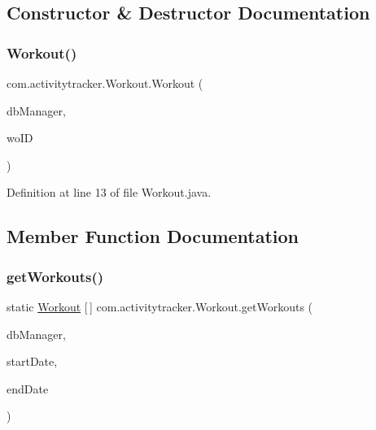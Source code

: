 \subsection{Constructor \& Destructor Documentation}
\mbox{\label{classcom_1_1activitytracker_1_1_workout_a2a991c1f2bcd46bc71e81b2c9bc3982a}} 
\subsubsection{\texorpdfstring{Workout()}{Workout()}}
{\footnotesize\ttfamily com.\+activitytracker.\+Workout.\+Workout (\begin{DoxyParamCaption}\item[{final \mbox{\hyperlink{classcom_1_1activitytracker_1_1_d_b_manager}{D\+B\+Manager}}}]{db\+Manager,  }\item[{final int}]{wo\+ID }\end{DoxyParamCaption})\hspace{0.3cm}{\ttfamily [package]}}



Definition at line 13 of file Workout.\+java.



\subsection{Member Function Documentation}
\mbox{\label{classcom_1_1activitytracker_1_1_workout_a822ea171fb097e7ffaebe436ae503e80}} 
\subsubsection{\texorpdfstring{get\+Workouts()}{getWorkouts()}}
{\footnotesize\ttfamily static \mbox{\hyperlink{classcom_1_1activitytracker_1_1_workout}{Workout}} \mbox{[}$\,$\mbox{]} com.\+activitytracker.\+Workout.\+get\+Workouts (\begin{DoxyParamCaption}\item[{final \mbox{\hyperlink{classcom_1_1activitytracker_1_1_d_b_manager}{D\+B\+Manager}}}]{db\+Manager,  }\item[{final Date}]{start\+Date,  }\item[{final Date}]{end\+Date }\end{DoxyParamCaption})\hspace{0.3cm}{\ttfamily [static]}}



